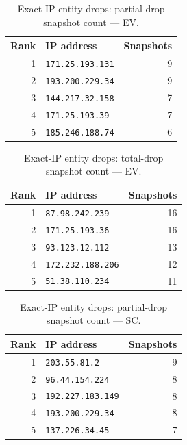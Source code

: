 \documentclass[conference]{IEEEtran}
\begin{document}
\begin{table}[H]
\caption{Exact-IP entity drops: partial-drop snapshot count --- EV.}
\begin{center}\small
\begin{tabular}{|r|l|r|}
\hline
\textbf{Rank} & \textbf{IP address} & \textbf{Snapshots} \\ \hline
1 & \texttt{171.25.193.131} & 9 \\ \hline
2 & \texttt{193.200.229.34} & 9 \\ \hline
3 & \texttt{144.217.32.158} & 7 \\ \hline
4 & \texttt{171.25.193.39} & 7 \\ \hline
5 & \texttt{185.246.188.74} & 6 \\ \hline
\end{tabular}
\label{tab:ipdrop_partial_ephemeral_variable}
\end{center}\end{table}
 
\begin{table}[H]
\caption{Exact-IP entity drops: total-drop snapshot count --- EV.}
\begin{center}\small
\begin{tabular}{|r|l|r|}
\hline
\textbf{Rank} & \textbf{IP address} & \textbf{Snapshots} \\ \hline
1 & \texttt{87.98.242.239} & 16 \\ \hline
2 & \texttt{171.25.193.36} & 16 \\ \hline
3 & \texttt{93.123.12.112} & 13 \\ \hline
4 & \texttt{172.232.188.206} & 12 \\ \hline
5 & \texttt{51.38.110.234} & 11 \\ \hline
\end{tabular}
\label{tab:ipdrop_total_ephemeral_variable}
\end{center}\end{table}
 
\begin{table}[H]
\caption{Exact-IP entity drops: partial-drop snapshot count --- SC.}
\begin{center}\small
\begin{tabular}{|r|l|r|}
\hline
\textbf{Rank} & \textbf{IP address} & \textbf{Snapshots} \\ \hline
1 & \texttt{203.55.81.2} & 9 \\ \hline
2 & \texttt{96.44.154.224} & 8 \\ \hline
3 & \texttt{192.227.183.149} & 8 \\ \hline
4 & \texttt{193.200.229.34} & 8 \\ \hline
5 & \texttt{137.226.34.45} & 7 \\ \hline
\end{tabular}
\label{tab:ipdrop_partial_static_control}
\end{center}\end{table}
 
\end{document}
